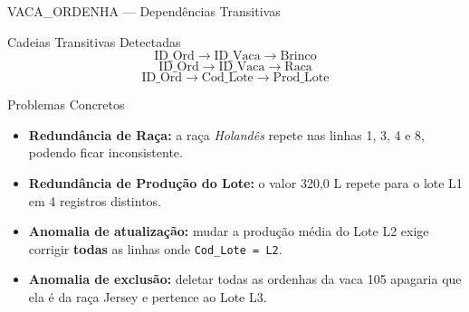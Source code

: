 \documentclass[9pt]{beamer}
\begin{document}
\begin{frame}{VACA\_ORDENHA — Dependências Transitivas}
\small
\begin{block}{Cadeias Transitivas Detectadas}
\[
  \text{ID\_Ord} \to \text{ID\_Vaca} \to \text{Brinco}
\]
\[
  \text{ID\_Ord} \to \text{ID\_Vaca} \to \text{Raca}
\]
\[
  \text{ID\_Ord} \to \text{Cod\_Lote} \to \text{Prod\_Lote}
\]
\end{block}

\vspace{0.3cm}

\begin{alertblock}{Problemas Concretos}
\begin{itemize}
  \item \textbf{Redundância de Raça:} a raça \textit{Holandês} repete nas linhas 1, 3, 4 e 8, podendo ficar inconsistente.
  \item \textbf{Redundância de Produção do Lote:} o valor 320,0 L repete para o lote L1 em 4 registros distintos.
  \item \textbf{Anomalia de atualização:} mudar a produção média do Lote L2 exige corrigir \textbf{todas} as linhas onde \texttt{Cod\_Lote = L2}.
  \item \textbf{Anomalia de exclusão:} deletar todas as ordenhas da vaca 105 apagaria que ela é da raça Jersey e pertence ao Lote L3.
\end{itemize}
\end{alertblock}
\end{frame}
\end{document}
